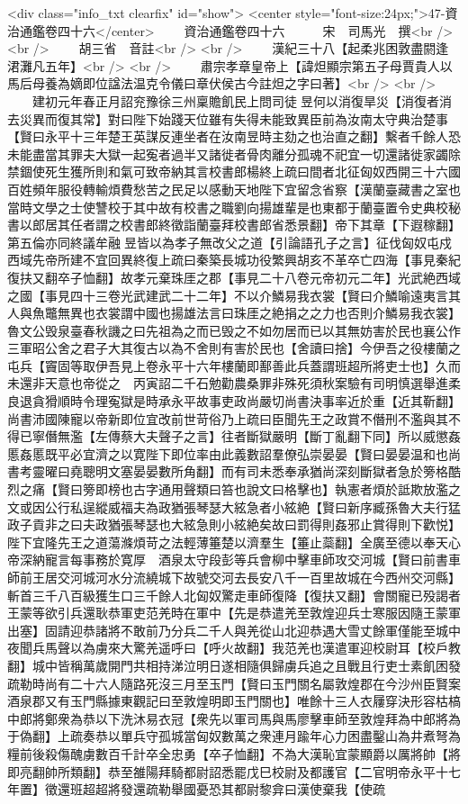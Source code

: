 <div class="info_txt clearfix" id="show">
<center style="font-size:24px;">47-資治通鑑卷四十六</center>
  　　資治通鑑卷四十六　　　宋　司馬光　撰<br />
<br />
　　胡三省　音註<br />
<br />
　　漢紀三十八【起柔兆困敦盡閼逢涒灘凡五年】<br />
<br />
　　肅宗孝章皇帝上【諱炟顯宗第五子母賈貴人以馬后母養為嫡即位諡法温克令儀曰章伏侯古今註炟之字曰著】<br />
<br />
　　建初元年春正月詔兖豫徐三州稟贍飢民上問司徒昱何以消復旱災【消復者消去災異而復其常】對曰陛下始踐天位雖有失得未能致異臣前為汝南太守典治楚事【賢曰永平十三年楚王英謀反連坐者在汝南昱時主劾之也治直之翻】繫者千餘人恐未能盡當其罪夫大獄一起寃者過半又諸徙者骨肉離分孤魂不祀宜一切還諸徙家蠲除禁錮使死生獲所則和氣可致帝納其言校書郎楊終上疏曰間者北征匈奴西開三十六國百姓頻年服役轉輸煩費愁苦之民足以感動天地陛下宜留念省察【漢蘭臺藏書之室也當時文學之士使讐校于其中故有校書之職劉向揚雄輩是也東都于蘭臺置令史典校秘書以郎居其任者謂之校書郎終徵詣蘭臺拜校書郎省悉景翻】帝下其章【下遐稼翻】第五倫亦同終議牟融昱皆以為孝子無改父之道【引論語孔子之言】征伐匈奴屯戍西域先帝所建不宜回異終復上疏曰秦築長城功役繁興胡亥不革卒亡四海【事見秦紀復扶又翻卒子恤翻】故孝元棄珠厓之郡【事見二十八卷元帝初元二年】光武絶西域之國【事見四十三卷光武建武二十二年】不以介鱗易我衣裳【賢曰介鱗喻遠夷言其人與魚鼈無異也衣裳謂中國也揚雄法言曰珠厓之絶捐之之力也否則介鱗易我衣裳】魯文公毁泉臺春秋譏之曰先祖為之而已毁之不如勿居而已以其無妨害於民也襄公作三軍昭公舍之君子大其復古以為不舍則有害於民也【舍讀曰捨】今伊吾之役樓蘭之屯兵【竇固等取伊吾見上卷永平十六年樓蘭即鄯善此兵蓋謂班超所將吏士也】久而未還非天意也帝從之　丙寅詔二千石勉勸農桑罪非殊死須秋案驗有司明慎選舉進柔良退貪猾順時令理寃獄是時承永平故事吏政尚嚴切尚書決事率近於重【近其靳翻】尚書沛國陳寵以帝新即位宜改前世苛俗乃上疏曰臣聞先王之政賞不僭刑不濫與其不得已寧僭無濫【左傳蔡大夫聲子之言】往者斷獄嚴明【斷丁亂翻下同】所以威懲姦慝姦慝既平必宜濟之以寛陛下即位率由此義數詔羣僚弘崇晏晏【賢曰晏晏温和也尚書考靈曜曰堯聰明文塞晏晏數所角翻】而有司未悉奉承猶尚深刻斷獄者急於篣格酷烈之痛【賢曰篣即榜也古字通用聲類曰笞也說文曰格擊也】執憲者煩於詆欺放濫之文或因公行私逞縱威福夫為政猶張琴瑟大絃急者小絃絶【賢曰新序臧孫魯大夫行猛政子貢非之曰夫政猶張琴瑟也大絃急則小絃絶矣故曰罰得則姦邪止賞得則下歡悦】陛下宜隆先王之道蕩滌煩苛之法輕薄箠楚以濟羣生【箠止蘂翻】全廣至德以奉天心帝深納寵言每事務於寛厚　酒泉太守段彭等兵會柳中擊車師攻交河城【賢曰前書車師前王居交河城河水分流繞城下故號交河去長安八千一百里故城在今西州交河縣】斬首三千八百級獲生口三千餘人北匈奴驚走車師復降【復扶又翻】會關寵已殁謁者王蒙等欲引兵還耿恭軍吏范羌時在軍中【先是恭遣羌至敦煌迎兵士寒服因隨王蒙軍出塞】固請迎恭諸將不敢前乃分兵二千人與羌從山北迎恭遇大雪丈餘軍僅能至城中夜聞兵馬聲以為虜來大驚羌遥呼曰【呼火故翻】我范羌也漢遣軍迎校尉耳【校戶教翻】城中皆稱萬歲開門共相持涕泣明日遂相隨俱歸虜兵追之且戰且行吏士素飢困發疏勒時尚有二十六人隨路死沒三月至玉門【賢曰玉門關名屬敦煌郡在今沙州臣賢案酒泉郡又有玉門縣據東觀記曰至敦煌明即玉門關也】唯餘十三人衣屨穿決形容枯槁中郎將鄭衆為恭以下洗沐易衣冠【衆先以軍司馬與馬廖擊車師至敦煌拜為中郎將為于偽翻】上疏奏恭以單兵守孤城當匈奴數萬之衆連月踰年心力困盡鑿山為井煮弩為糧前後殺傷醜虜數百千計卒全忠勇【卒子恤翻】不為大漢恥宜蒙顯爵以厲將帥【將即亮翻帥所類翻】恭至雒陽拜騎都尉詔悉罷戊巳校尉及都護官【二官明帝永平十七年置】徵還班超超將發還疏勒舉國憂恐其都尉黎弇曰漢使棄我【使疏